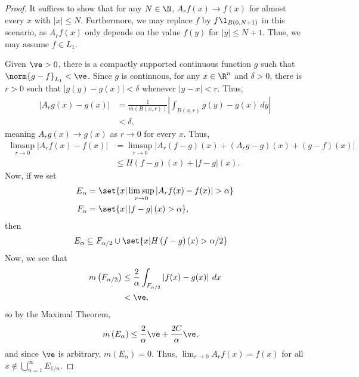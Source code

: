 \documentclass[10pt]{mypackage}
\begin{document}
\begin{proof}
  It suffices to show that for any $N\in \N$, $A_rf(x) \rightarrow f(x)$ for almost every $x$ with $\left\vert x \right\vert \leq N$. Furthermore, we may replace $f$ by $f\1_{B\left( 0,N+1 \right)}$ in this scenario, as $A_rf(x)$ only depends on the value $f(y)$ for $\left\vert y \right\vert \leq N+1$. Thus, we may assume $f\in L_1$.\newline

  Given $\ve > 0$, there is a compactly supported continuous function $g$ such that $\norm{g-f}_{L_1} < \ve$. Since $g$ is continuous, for any $x\in \R^n$ and $\delta > 0$, there is $r > 0$ such that $\left\vert g(y)-g(x) \right\vert < \delta$ whenever $\left\vert y-x \right\vert < r$. Thus,
  \begin{align*}
    \left\vert A_rg(x) - g(x) \right\vert &= \frac{1}{m\left( B\left( x,r \right) \right)} \left\vert \int_{B\left( x,r \right)}^{} g(y)-g(x)\:dy \right\vert\\
                                          &< \delta,
  \end{align*}
  meaning $A_rg(x) \rightarrow g(x)$ as $r\rightarrow 0$ for every $x$. Thus,
  \begin{align*}
    \limsup_{r\rightarrow 0} \left\vert A_rf(x) - f(x) \right\vert &= \limsup_{r\rightarrow 0} \left\vert A_r\left( f-g \right)(x) + \left( A_rg-g \right)(x) + \left( g-f \right)(x) \right\vert\\
                                                                   &\leq H\left( f-g \right)(x) + \left\vert f-g \right\vert(x).
  \end{align*}
  Now, if we set
  \begin{align*}
    E_{\alpha} &= \set{x | \limsup_{r\rightarrow 0}\left\vert A_rf(x) - f(x) \right\vert > \alpha}\\
    F_{\alpha} &= \set{x | \left\vert f-g \right\vert(x) > \alpha},
  \end{align*}
  then
  \begin{align*}
    E_{\alpha} &\subseteq F_{\alpha/2} \cup \set{x | H\left( f-g \right)(x) > \alpha/2}
  \end{align*}
  Now, we see that
  \begin{align*}
    m\left( F_{\alpha/2} \right) &\leq \frac{2}{\alpha} \int_{F_{\alpha/2}}^{} \left\vert f(x)-g(x) \right\vert\:dx\\
                                 &< \ve,
  \end{align*}
  so by the Maximal Theorem,
  \begin{align*}
    m\left( E_{\alpha} \right) &\leq \frac{2}{\alpha} \ve + \frac{2C}{\alpha} \ve,
  \end{align*}
  and since $\ve$ is arbitrary, $m\left( E_{\alpha} \right) = 0$. Thus, $\lim_{r\rightarrow 0}A_rf(x) = f(x)$ for all $x\notin \bigcup_{n=1}^{\infty}E_{1/n}$.\newline


\end{proof}
\end{document}
